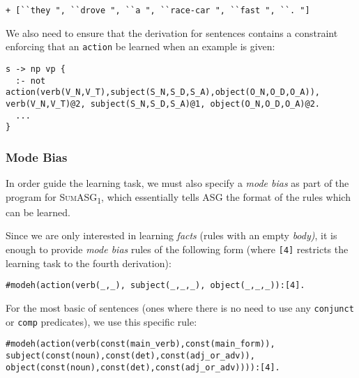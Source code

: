 \begin{displayquote}
\begin{lstlisting}[numbers=none]
+ [``they ", ``drove ", ``a ", ``race-car ", ``fast ", ``. "]
\end{lstlisting}
\end{displayquote}

We also need to ensure that the derivation for sentences contains a constraint enforcing that an \texttt{action} be learned when an example is given:

\begin{displayquote}
\begin{lstlisting}[numbers=none]
s -> np vp {
  :- not action(verb(V_N,V_T),subject(S_N,S_D,S_A),object(O_N,O_D,O_A)), verb(V_N,V_T)@2, subject(S_N,S_D,S_A)@1, object(O_N,O_D,O_A)@2.
  ...
}
\end{lstlisting}
\end{displayquote}

\subsubsection{Mode Bias}

In order guide the learning task, we must also specify a \textit{mode bias} as part of the program for \textsc{SumASG\textsubscript{1}}, which essentially tells ASG the format of the rules which can be learned.

Since we are only interested in learning \textit{facts} (rules with an empty \textit{body)}, it is enough to provide \textit{mode bias} rules of the following form (where \texttt{[4]} restricts the learning task to the fourth derivation):

\begin{displayquote}
\begin{lstlisting}[numbers=none]
#modeh(action(verb(_,_), subject(_,_,_), object(_,_,_)):[4].
\end{lstlisting}
\end{displayquote}

For the most basic of sentences (ones where there is no need to use any \texttt{conjunct} or \texttt{comp} predicates), we use this specific rule:

\begin{displayquote}
\begin{lstlisting}[numbers=none]
#modeh(action(verb(const(main_verb),const(main_form)), subject(const(noun),const(det),const(adj_or_adv)), object(const(noun),const(det),const(adj_or_adv)))):[4].
\end{lstlisting}
\end{displayquote}

